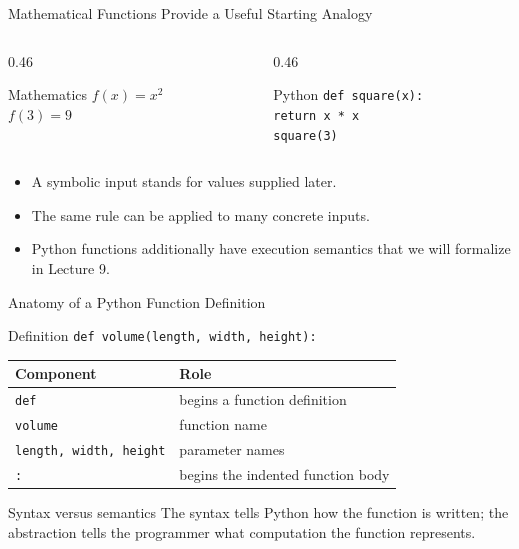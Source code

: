\documentclass[aspectratio=169,10pt]{beamer}
\begin{document}
\begin{frame}{Mathematical Functions Provide a Useful Starting Analogy}
  \begin{columns}[T,onlytextwidth]
    \begin{column}{0.46\textwidth}
      \begin{block}{Mathematics}
        \centering
        $f(x) = x^2$\\[0.12in]
        $f(3) = 9$
      \end{block}
    \end{column}

    \begin{column}{0.46\textwidth}
      \begin{block}{Python}
        \texttt{def square(x):}\\
        \hspace*{1em}\texttt{return x * x}\\[0.12in]
        \texttt{square(3)}
      \end{block}
    \end{column}
  \end{columns}

  \begin{itemize}
    \item A symbolic input stands for values supplied later.
    \item The same rule can be applied to many concrete inputs.
    \item Python functions additionally have execution semantics that we will formalize in Lecture 9.
  \end{itemize}
\end{frame}

\begin{frame}{Anatomy of a Python Function Definition}
  \begin{block}{Definition}
    \centering
    \Large\texttt{def volume(length, width, height):}
  \end{block}

  \begin{center}
    \renewcommand{\arraystretch}{1.35}
    \begin{tabular}{l|l}
      \textbf{Component} & \textbf{Role} \\\hline
      \texttt{def} & begins a function definition \\
      \texttt{volume} & function name \\
      \texttt{length, width, height} & parameter names \\
      \texttt{:} & begins the indented function body
    \end{tabular}
  \end{center}

  \begin{alertblock}{Syntax versus semantics}
    The syntax tells Python how the function is written; the abstraction tells the programmer what computation the function represents.
  \end{alertblock}
\end{frame}
\end{document}
